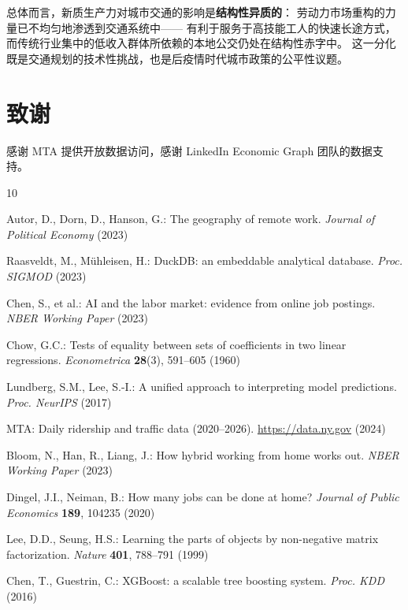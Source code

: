 \documentclass[runningheads]{llncs}
\begin{document}
总体而言，新质生产力对城市交通的影响是\textbf{结构性异质的}：
劳动力市场重构的力量已不均匀地渗透到交通系统中——
有利于服务于高技能工人的快速长途方式，
而传统行业集中的低收入群体所依赖的本地公交仍处在结构性赤字中。
这一分化既是交通规划的技术性挑战，也是后疫情时代城市政策的公平性议题。

\section*{致谢}
感谢 MTA 提供开放数据访问，感谢 LinkedIn Economic Graph 团队的数据支持。

\begin{thebibliography}{10}

Autor, D., Dorn, D., Hanson, G.: The geography of remote work.
\textit{Journal of Political Economy} (2023)

Raasveldt, M., M\"{u}hleisen, H.: DuckDB: an embeddable analytical database.
\textit{Proc. SIGMOD} (2023)

Chen, S., et al.: AI and the labor market: evidence from online job postings.
\textit{NBER Working Paper} (2023)

Chow, G.C.: Tests of equality between sets of coefficients in two linear regressions.
\textit{Econometrica} \textbf{28}(3), 591--605 (1960)

Lundberg, S.M., Lee, S.-I.: A unified approach to interpreting model predictions.
\textit{Proc. NeurIPS} (2017)

MTA: Daily ridership and traffic data (2020--2026).
\url{https://data.ny.gov} (2024)

Bloom, N., Han, R., Liang, J.: How hybrid working from home works out.
\textit{NBER Working Paper} (2023)

Dingel, J.I., Neiman, B.: How many jobs can be done at home?
\textit{Journal of Public Economics} \textbf{189}, 104235 (2020)

Lee, D.D., Seung, H.S.: Learning the parts of objects by non-negative matrix factorization.
\textit{Nature} \textbf{401}, 788--791 (1999)

Chen, T., Guestrin, C.: XGBoost: a scalable tree boosting system.
\textit{Proc. KDD} (2016)

\end{thebibliography}
\end{document}
